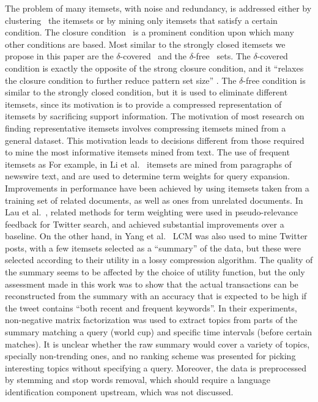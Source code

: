 \documentclass{sig-alternate}
\begin{document}
The problem of many itemsets, with noise and redundancy, is addressed either
by clustering~\cite{yan2005summarizing} the itemsets or by mining only
itemsets that satisfy a certain condition.
The closure condition~\cite{pasquier1999discovering} is a prominent condition
upon which many other conditions are based.
Most similar to the strongly closed itemsets we propose in this paper
are the $\delta$-covered~\cite{xin2005mining} and the
$\delta$-free~\cite{boulicaut2003free} sets.
The $\delta$-covered condition is exactly the opposite of the strong closure
condition, and it ``relaxes the closure condition to further reduce pattern
set size'' \cite{liu2012finding}.
The $\delta$-free condition is similar to the strongly closed condition,
but it is used to eliminate different itemsets, since its motivation
is to provide a compressed representation of itemsets by sacrificing support
information. The motivation of most research on finding representative itemsets involves
compressing itemsets mined from a general dataset.
This motivation leads to decisions different from those required to mine the
most informative itemsets mined from text.
\cite{vreeken2011krimp}
\cite{mampaey2011tell}
The use of frequent itemsets as 
For example, in Li et al.~\cite{li2010mining} itemsets are mined from
paragraphs of newswire text, and are used to determine term weights for query
expansion.
Improvements in performance have been achieved by using itemsets taken from
a training set of related documents, as well as ones from unrelated documents.
In Lau et al.~\cite{laumicroblog}, related methods for term weighting were
used in pseudo-relevance feedback for Twitter search,
and achieved substantial improvements over a baseline.
On the other hand, in Yang et al.~\cite{yang2012framework} LCM was also used
to mine Twitter posts, with a few itemsets selected as a ``summary'' of the
data, but these were selected according to their utility in a
lossy compression algorithm.
The quality of the summary seems to be affected by the choice of utility
function, but the only assessment made in this work was to show that the
actual transactions can be reconstructed from the summary with an accuracy
that is expected to be high if the tweet contains ``both recent and frequent
keywords''.
In their experiments, non-negative matrix factorization was used to extract
topics from parts of the summary matching a query (world cup) and specific
time intervals (before certain matches).
It is unclear whether the raw summary would cover a variety of topics,
specially non-trending ones, and no ranking scheme was presented for picking
interesting topics without specifying a query.
Moreover, the data is preprocessed by stemming and stop words removal,
which should require a language identification component upstream, which was
not discussed.
\end{document}
